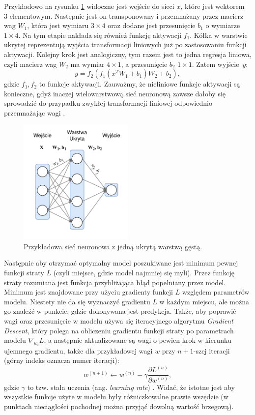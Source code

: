 \documentclass{pracalicmgr}
\begin{document}
	 Przykładowo na rysunku \ref{fig:simple} widoczne jest wejście do sieci $x$, które jest wektorem 3-elementowym. Następnie jest on transponowany i przemnażany przez macierz wag $W_1$, która jest wymiaru $3\times4$ oraz dodane jest przesunięcie $b_1$ o wymiarze $1\times4$. Na tym etapie nakłada się również funkcję aktywacji $f_1$. Kółka w warstwie ukrytej reprezentują wyjścia transformacji liniowych już po zastosowaniu funkcji aktywacji. Kolejny krok jest analogiczny, tym razem jest to jedna regresja liniowa, czyli macierz wag $W_2$ ma wymiar $4\times1$, a przesunięcie $b_2$ $1\times1$. Zatem wyjście~$y$: $$y = f_2(f_1(x^TW_1 + b_1)W_2 + b_2),$$ gdzie $f_1, f_2$ to funkcje aktywacji. Zauważmy, że nieliniowe funkcje aktywacji są konieczne, gdyż inaczej wielowarstwową sieć neuronową zawsze dałoby się sprowadzić do przypadku zwykłej transformacji liniowej odpowiednio przemnażając wagi \cite{dl}.
	
	\begin{figure}[H]
	\centering
	\includegraphics[width=0.5\textwidth]{simple_nn.pdf}
	\caption{Przykładowa sieć neuronowa z jedną ukrytą warstwą gęstą.}
	\label{fig:simple}
	\end{figure}
	
	Następnie aby otrzymać optymalny model poszukiwane jest minimum pewnej funkcji straty $L$ (czyli miejsce, gdzie model najmniej się myli). Przez funkcję straty rozumiana jest funkcja przybliżająca błąd popełniany przez model. Minimum jest znajdowane przy użyciu gradienty funkcji $L$ względem parametrów modelu. Niestety nie da się wyznaczyć gradientu $L$ w każdym miejscu, ale można go znaleźć w punkcie, gdzie dokonywana jest predykcja. Także, aby poprawić wagi oraz przesunięcie w modelu używa się iteracyjnego algorytmu \textit{Gradient Descent}, który polega na obliczeniu gradientu funkcji straty po parametrach modelu $\nabla_{w_i}L$, a następnie aktualizowane są wagi o pewien krok w kierunku ujemnego gradientu, także dla przykładowej wagi $w$ przy $n+1$-szej iteracji (górny indeks oznacza numer iteracji): $$w^{(n+1)} \leftarrow w^{(n)} - \gamma \frac{\partial L^{(n)}}{\partial w^{(n)}},$$ gdzie $\gamma$ to tzw. stała uczenia (ang. \textit{learning rate}) \cite{dl}. Widać, że istotne jest aby wszystkie funkcje użyte w modelu były różniczkowalne prawie wszędzie (w punktach nieciągłości pochodnej można przyjąć dowolną wartość brzegową). 
	
\end{document}

